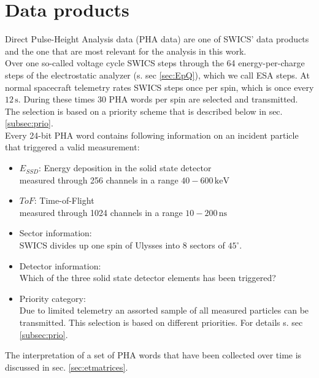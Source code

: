 \section{Data products}
Direct Pulse-Height Analysis data (PHA data) are one of SWICS' data products and the one that are most relevant for the analysis in this work.\\
Over one so-called voltage cycle SWICS steps through the 64 energy-per-charge steps of the electrostatic analyzer (s. sec \ref{sec:EpQ}), which we call ESA steps. At normal spacecraft telemetry rates SWICS steps once per spin, which is once every $12\,\mathrm{s}$. During these times 30 PHA words per spin are selected and transmitted. The selection is based on a priority scheme that is described below in sec. \ref{subsec:prio}.\\
Every 24-bit PHA word contains following information on an incident particle that triggered a valid measurement:
\begin{itemize}
	\item $E_{SSD}$: Energy deposition in the solid state detector \\
	measured through 256 channels in a range $40 - 600\,\mathrm{keV}$
	\item $ToF$: Time-of-Flight\\
	measured through 1024 channels in a range $10 - 200\,\mathrm{ns}$
	\item Sector information:\\
	SWICS divides up one spin of Ulysses into 8 sectors of $45^\circ$.
	\item Detector information: \\
	Which of the three solid state detector elements has been triggered?
	\item Priority category: \\
	Due to limited telemetry an assorted sample of all measured particles can be transmitted. This selection is based on different priorities. For details s. sec \ref{subsec:prio}.
\end{itemize}
The interpretation of a set of PHA words that have been collected over time is discussed in sec. \ref{sec:etmatrices}. 
%
